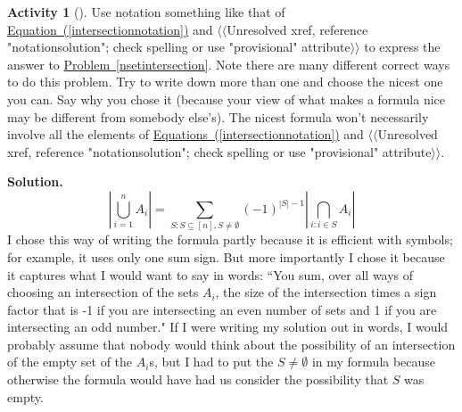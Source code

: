 \documentclass[10pt,]{book}
\theoremstyle{plain}
\theoremstyle{definition}
\newtheorem{activity}[project]{Activity}
\numberwithin{equation}{chapter}
\begin{document}
\begin{activity}[]\label{inclusion-exclusionunion}
Use notation something like that of \hyperref[intersectionnotation]{Equation~(\ref{intersectionnotation})} and {$\langle\langle$Unresolved xref, reference "notationsolution"; check spelling or use "provisional" attribute$\rangle\rangle$} to express the answer to \hyperref[nsetintersection]{Problem~\ref{nsetintersection}}. Note there are many different correct ways to do this problem. Try to write down more than one and choose the nicest one you can. Say why you chose it (because your view of what makes a formula nice may be different from somebody else's). The nicest formula won't necessarily involve all the elements of \hyperref[intersectionnotation]{Equations~(\ref{intersectionnotation})} and {$\langle\langle$Unresolved xref, reference "notationsolution"; check spelling or use "provisional" attribute$\rangle\rangle$}.%
\par\medskip\noindent%
\textbf{Solution.}\quad %
\begin{equation*}
\left|\bigcup_{i=1}^n A_i\right| = \sum_{S:S\subseteq [n],
S\not=\emptyset}(-1)^{|S|-1}|\bigcap_{i: i\in S}A_i|
\end{equation*}
I chose this way of writing the formula partly because it is efficient with symbols; for example, it uses only one sum sign. But more importantly I chose it because it captures what I would want to say in words: ``You sum, over all ways of choosing an intersection of the sets \(A_i\), the size of the intersection times a sign factor that is -1 if you are intersecting an even number of sets and 1 if you are intersecting an odd number." If I were writing my solution out in words, I would probably assume that nobody would think about the possibility of an intersection of the empty set of the \(A_i\)s, but I had to put the \(S\not=\emptyset\) in my formula because otherwise the formula would have had us consider the possibility that \(S\) was empty.%
\end{activity}
\end{document}
